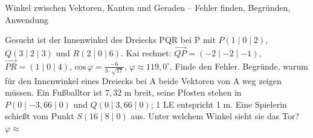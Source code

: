 \begin{aufgabe}{Winkel zwischen Vektoren, Kanten und Geraden – Fehler finden, Begründen, Anwendung}
\begin{teile}
\teil Gesucht ist der Innenwinkel des Dreiecks PQR bei P mit $P(1 \mid 0 \mid 2)$, $Q(3 \mid 2 \mid 3)$ und $R(2 \mid 0 \mid 6)$. Kai rechnet: $\overrightarrow{QP} = (-2 \mid -2 \mid -1)$, $\overrightarrow{PR} = (1 \mid 0 \mid 4)$, $\mathrm{cos}\,\varphi = \frac{-6}{3 \cdot \sqrt{17}}$, $\varphi \approx 119{,}0^\circ$. Finde den Fehler.
\teil Begründe, warum für den Innenwinkel eines Dreiecks bei A beide Vektoren von A weg zeigen müssen.
\teil Ein Fußballtor ist $7{,}32$ m breit, seine Pfosten stehen in $P(0 \mid -3{,}66 \mid 0)$ und $Q(0 \mid 3{,}66 \mid 0)$; 1 LE entspricht 1 m. Eine Spielerin schießt vom Punkt $S(16 \mid 8 \mid 0)$ aus. Unter welchem Winkel sieht sie das Tor? $\varphi \approx$ \leerfeld[$^\circ$]
\end{teile}
\end{aufgabe}

